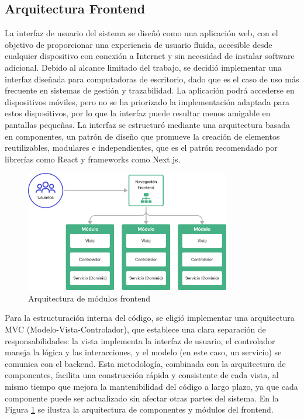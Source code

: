 \subsection{Arquitectura Frontend}

La interfaz de usuario del sistema se diseñó como una aplicación web, con el objetivo de proporcionar una experiencia de usuario fluida, accesible desde cualquier dispositivo con conexión a Internet y sin necesidad de instalar software adicional. Debido al alcance limitado del trabajo, se decidió implementar una interfaz diseñada para computadoras de escritorio, dado que es el caso de uso más frecuente en sistemas de gestión y trazabilidad. La aplicación podrá accederse en dispositivos móviles, pero no se ha priorizado la implementación adaptada para estos dispositivos, por lo que la interfaz puede resultar menos amigable en pantallas pequeñas. La interfaz se estructuró mediante una arquitectura basada en componentes, un patrón de diseño que promueve la creación de elementos reutilizables, modulares e independientes, que es el patrón recomendado por librerías como React y frameworks como Next.js.

\begin{figure}[!htb]
\centering
\includegraphics[width=0.8\textwidth]{Figures/frontend-architecture.png}
\caption{Arquitectura de módulos frontend}
\label{fig:frontend-architecture}
\end{figure}

Para la estructuración interna del código, se eligió implementar una arquitectura MVC (Modelo-Vista-Controlador), que establece una clara separación de responsabilidades: la vista implementa la interfaz de usuario, el controlador maneja la lógica y las interacciones, y el modelo (en este caso, un servicio) se comunica con el backend. Esta metodología, combinada con la arquitectura de componentes, facilita una construcción rápida y consistente de cada vista, al mismo tiempo que mejora la mantenibilidad del código a largo plazo, ya que cada componente puede ser actualizado sin afectar otras partes del sistema. En la Figura \ref{fig:frontend-architecture} se ilustra la arquitectura de componentes y módulos del frontend.

